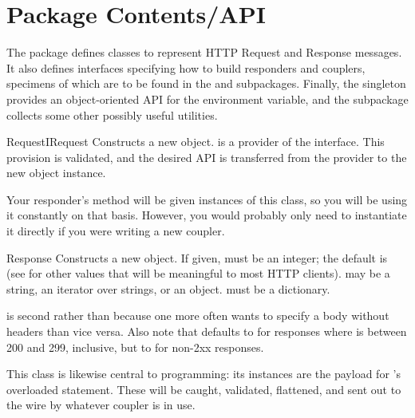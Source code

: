 \chapter{Package Contents/API \label{api}}

The  package defines classes to represent HTTP Request and
Response messages. It also defines interfaces specifying how to build responders
and couplers, specimens of which are to be found in the  and
 subpackages. Finally, the  singleton provides an
object-oriented API for the  environment variable, and the
 subpackage collects some other possibly useful utilities.



\begin{classdesc}{Request}{IRequest}
Constructs a new  object.  is a provider of the
 interface. This provision is validated, and the desired API is
transferred from the  provider to the new object instance.

Your responder's  method will be given instances of this class,
so you will be using it constantly on that basis. However, you would probably
only need to instantiate it directly if you were writing a new coupler.
\end{classdesc}



\begin{classdesc}{Response}{  }
Constructs a new  object. If given,  must be
an integer; the default is
(see  for other values that will be meaningful to most HTTP clients). 
may be a string, an iterator over strings, or an 
object.  must be a dictionary.

 is second rather than  because one more often wants to
specify a body without headers than vice versa. Also note that
 defaults to  for responses where
 is between 200 and 299, inclusive, but to  for
non-2xx responses.

This class is likewise central to  programming: its instances are
the payload for 's overloaded  statement. These will
be caught, validated, flattened, and sent out to the wire by whatever coupler is
in use.
\end{classdesc}








